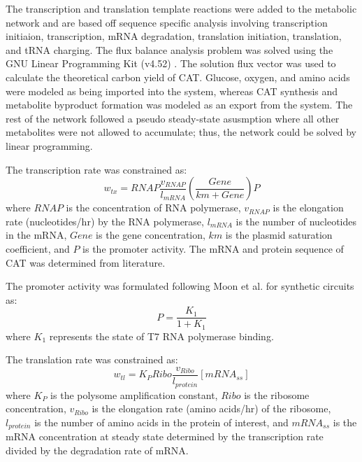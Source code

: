 \documentclass[12pt]{article}
\begin{document}
The transcription and translation template reactions were added to the metabolic network and are based off sequence specific analysis \cite{2002_allen_palsson} involving transcription initiaion, transcription, mRNA degradation, translation initiation, translation, and tRNA charging. 
The flux balance analysis problem was solved using the GNU Linear Programming Kit (v4.52) \cite{GLPK}.
The solution flux vector was used to calculate the theoretical carbon yield of CAT.
Glucose, oxygen, and amino acids were modeled as being imported into the system, whereas CAT synthesis and metabolite byproduct formation was modeled as an export from the system.
The rest of the network followed a pseudo steady-state asusmption where all other metabolites were not allowed to accumulate; thus, the network could be solved by linear programming.

The transcription rate was constrained as:
\begin{equation}\nonumber
	w_{tx} = RNAP\frac{v_{RNAP}}{l_{mRNA}}\left(\frac{Gene}{km+Gene}\right)P
\end{equation}
where $RNAP$ is the concentration of RNA polymerase, $v_{RNAP}$ is the elongation rate (nucleotides/hr) by the RNA polymerase, $l_{mRNA}$ is the number of nucleotides in the mRNA, $Gene$ is the gene concentration, $km$ is the plasmid saturation coefficient, and $P$ is the promoter activity.
The mRNA and protein sequence of CAT was determined from literature. 
 
The promoter activity was formulated following Moon et al. for synthetic circuits as:
\begin{equation}\nonumber
	P = \frac{K_{1}}{1 + K_{1}}
\end{equation}
where $K_{1}$ represents the state of T7 RNA polymerase binding. 

The translation rate was constrained as:
 \begin{equation}\nonumber
	w_{tl} = K_{P}Ribo\frac{v_{Ribo}}{l_{protein}}[mRNA_{ss}]
\end{equation}
where $K_{P}$ is the polysome amplification constant, $Ribo$ is the ribosome concentration,  $v_{Ribo}$ is the elongation rate (amino acids/hr) of the ribosome, $l_{protein}$ is the number of amino acids in the protein of interest, and $mRNA_{ss}$ is the mRNA concentration at steady state determined by the transcription rate divided by the degradation rate of mRNA.  
\end{document}
